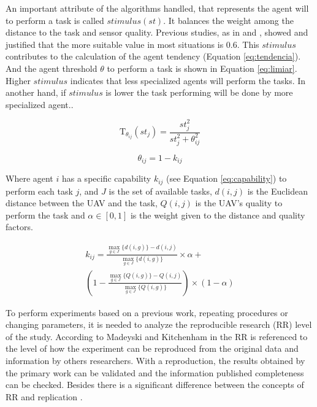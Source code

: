 An important attribute of the algorithms handled, that represents the agent will to perform a task is called $stimulus (st)$. It balances the weight among the distance to the task and sensor quality. Previous studies, as in \cite{ferreira2007swarm} and  \cite{MAS07}, showed and justified that the more suitable value in most situations is $0.6$. This $stimulus$ contributes to the calculation of the agent tendency  (Equation \ref{eq:tendencia}). And the agent threshold $\theta$ to perform a task is shown in Equation \ref{eq:limiar}. Higher $stimulus$ indicates that less specialized agents will perform the tasks. In another hand, if $stimulus$ is lower the task performing will be done by more specialized agent.\cite{bonabeau1999swarm}.

\begin{equation} \label{eq:tendencia}
	\textrm{T}_{\theta_{ij}}(st_j) = \frac{st_{j}^2}{st_{j}^2 + \theta_{ij}^2}
\end{equation}

\begin{equation} \label{eq:limiar}
	\theta_{ij} = 1 - k_{ij}
\end{equation}

Where agent $i$ has a specific capability $k_{ij}$ (see Equation \ref{eq:capability}) to perform each task $j$, and $J$ is the set of available tasks, $d(i,j)$ is the Euclidean distance between the UAV and the task, $Q(i,j)$ is the UAV's quality to perform the task and $\alpha \in [0,1]$  is the weight given to the distance and quality factors. 

\begin{equation} \label{eq:capability}
\begin{split}
k_{ij} = \frac{\max_{g \in J} \{d(i,g)\} - d(i,j)}{\max_{g \in J} \{d(i,g)\}} \times \alpha + \\
(1 - \frac{\max_{g \in J} \{Q(i,g)\} - Q(i,j)}{\max_{g \in J} \{Q(i,g)\}}) \times (1-\alpha)
\end{split}
\end{equation}


To perform experiments based on a previous work, repeating procedures or changing parameters, it is needed to analyze the reproducible research (RR) level of the study. According to Madeyski and Kitchenham in \cite{exp02} the RR is referenced to the level of how the experiment can be reproduced from the original data and information by others researchers. With a reproduction, the results obtained by the primary work can be validated and the information published completeness can be checked. Besides there is a significant difference between the concepts of RR and replication \cite{exp02} \cite{exp03}.

